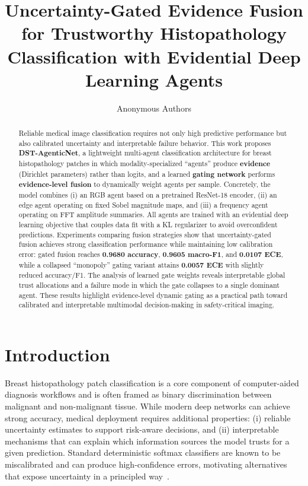 \documentclass[10pt]{article}
\title{Uncertainty-Gated Evidence Fusion for Trustworthy Histopathology Classification with Evidential Deep Learning Agents}
\author{Anonymous Authors}
\date{}
\begin{document}
\maketitle

\begin{abstract}
Reliable medical image classification requires not only high predictive performance but also calibrated uncertainty and interpretable failure behavior. This work proposes \textbf{DST-AgenticNet}, a lightweight multi-agent classification architecture for breast histopathology patches in which modality-specialized ``agents'' produce \textbf{evidence} (Dirichlet parameters) rather than logits, and a learned \textbf{gating network} performs \textbf{evidence-level fusion} to dynamically weight agents per sample. Concretely, the model combines (i) an RGB agent based on a pretrained ResNet-18 encoder, (ii) an edge agent operating on fixed Sobel magnitude maps, and (iii) a frequency agent operating on FFT amplitude summaries. All agents are trained with an evidential deep learning objective that couples data fit with a KL regularizer to avoid overconfident predictions. Experiments comparing fusion strategies show that uncertainty-gated fusion achieves strong classification performance while maintaining low calibration error: gated fusion reaches \textbf{0.9680 accuracy}, \textbf{0.9605 macro-F1}, and \textbf{0.0107 ECE}, while a collapsed ``monopoly'' gating variant attains \textbf{0.0057 ECE} with slightly reduced accuracy/F1. The analysis of learned gate weights reveals interpretable global trust allocations and a failure mode in which the gate collapses to a single dominant agent. These results highlight evidence-level dynamic gating as a practical path toward calibrated and interpretable multimodal decision-making in safety-critical imaging.
\end{abstract}

\section{Introduction}
\label{sec:intro}

Breast histopathology patch classification is a core component of computer-aided diagnosis workflows and is often framed as binary discrimination between malignant and non-malignant tissue. While modern deep networks can achieve strong accuracy, medical deployment requires additional properties: (i) reliable uncertainty estimates to support risk-aware decisions, and (ii) interpretable mechanisms that can explain which information sources the model trusts for a given prediction. Standard deterministic softmax classifiers are known to be miscalibrated and can produce high-confidence errors, motivating alternatives that expose uncertainty in a principled way~\cite{sensoy2018,gao2024}.
\end{document}
